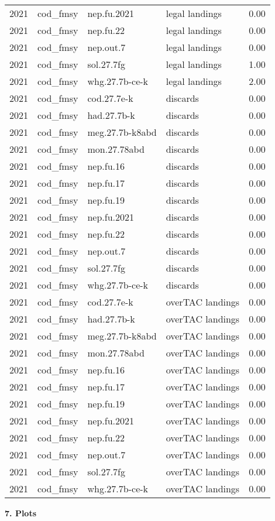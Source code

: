 \documentclass[
]{article}
\begin{document}
\begin{longtable}[]{@{}llllr@{}}
2021 & cod\_fmsy & nep.fu.2021 & legal landings & 0.00\tabularnewline
2021 & cod\_fmsy & nep.fu.22 & legal landings & 0.00\tabularnewline
2021 & cod\_fmsy & nep.out.7 & legal landings & 0.00\tabularnewline
2021 & cod\_fmsy & sol.27.7fg & legal landings & 1.00\tabularnewline
2021 & cod\_fmsy & whg.27.7b-ce-k & legal landings & 2.00\tabularnewline
2021 & cod\_fmsy & cod.27.7e-k & discards & 0.00\tabularnewline
2021 & cod\_fmsy & had.27.7b-k & discards & 0.00\tabularnewline
2021 & cod\_fmsy & meg.27.7b-k8abd & discards & 0.00\tabularnewline
2021 & cod\_fmsy & mon.27.78abd & discards & 0.00\tabularnewline
2021 & cod\_fmsy & nep.fu.16 & discards & 0.00\tabularnewline
2021 & cod\_fmsy & nep.fu.17 & discards & 0.00\tabularnewline
2021 & cod\_fmsy & nep.fu.19 & discards & 0.00\tabularnewline
2021 & cod\_fmsy & nep.fu.2021 & discards & 0.00\tabularnewline
2021 & cod\_fmsy & nep.fu.22 & discards & 0.00\tabularnewline
2021 & cod\_fmsy & nep.out.7 & discards & 0.00\tabularnewline
2021 & cod\_fmsy & sol.27.7fg & discards & 0.00\tabularnewline
2021 & cod\_fmsy & whg.27.7b-ce-k & discards & 0.00\tabularnewline
2021 & cod\_fmsy & cod.27.7e-k & overTAC landings & 0.00\tabularnewline
2021 & cod\_fmsy & had.27.7b-k & overTAC landings & 0.00\tabularnewline
2021 & cod\_fmsy & meg.27.7b-k8abd & overTAC landings &
0.00\tabularnewline
2021 & cod\_fmsy & mon.27.78abd & overTAC landings & 0.00\tabularnewline
2021 & cod\_fmsy & nep.fu.16 & overTAC landings & 0.00\tabularnewline
2021 & cod\_fmsy & nep.fu.17 & overTAC landings & 0.00\tabularnewline
2021 & cod\_fmsy & nep.fu.19 & overTAC landings & 0.00\tabularnewline
2021 & cod\_fmsy & nep.fu.2021 & overTAC landings & 0.00\tabularnewline
2021 & cod\_fmsy & nep.fu.22 & overTAC landings & 0.00\tabularnewline
2021 & cod\_fmsy & nep.out.7 & overTAC landings & 0.00\tabularnewline
2021 & cod\_fmsy & sol.27.7fg & overTAC landings & 0.00\tabularnewline
2021 & cod\_fmsy & whg.27.7b-ce-k & overTAC landings &
0.00\tabularnewline
\bottomrule
\end{longtable}

\textbf{7. Plots }
\end{document}
